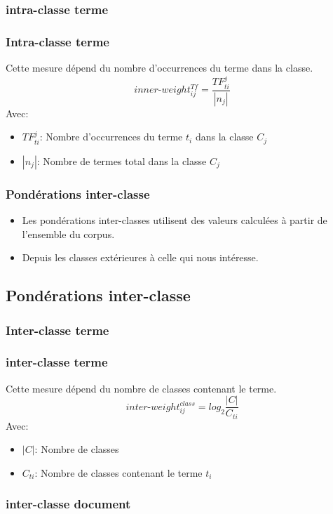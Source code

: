 \documentclass[12pt]{beamer}
\begin{document}
\begin{frame}
\subsubsection*{intra-classe terme}
\frametitle{Intra-classe terme}
Cette mesure dépend du nombre d'occurrences du terme dans la classe.
\[   inner\mbox{-}weight_{ij}^{Tf} = \frac{TF_{ti}^j}{|n_{j}|}\]
  Avec:
\begin{itemize}
	\item $TF_{ti}^j$: Nombre d'occurrences du terme $t_i$ dans la classe $C_j$	
	\item $|n_{j}|$: Nombre de termes total dans la classe $C_j$	
  \end{itemize}
\end{frame}  





\begin{frame}
\frametitle{Pondérations inter-classe}
\begin{itemize}
\item Les pondérations inter-classes utilisent des valeurs calculées à partir de l'ensemble du corpus.

\item Depuis les classes extérieures à celle qui nous intéresse.
\end{itemize}
\end{frame}

\begin{frame}
\subsection{Pondérations inter-classe}
\frametitle{Inter-classe terme}
\subsubsection*{inter-classe terme}

Cette mesure dépend du nombre de classes contenant le terme.
\[inter\mbox{-}weight_{ij}^{class} = log_2 \frac{|C|}{C_{ti}}\]
Avec:
\begin{itemize}
	\item $|C|$: Nombre de classes			
	\item $C_{ti}$: Nombre de classes contenant le terme $t_i$
  \end{itemize}
\end{frame}
\subsubsection*{inter-classe document}
\end{document}
